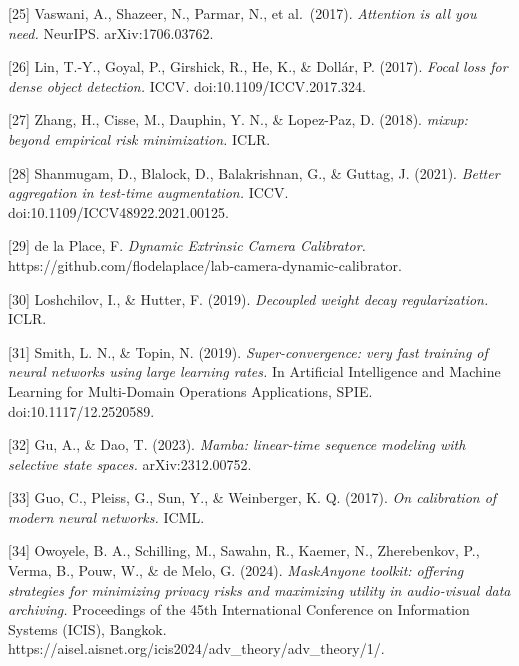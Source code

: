 \documentclass[
  11pt,
]{article}
\begin{document}
{[}25{]} Vaswani, A., Shazeer, N., Parmar, N., et al.~(2017).
\emph{Attention is all you need.} NeurIPS. arXiv:1706.03762.

{[}26{]} Lin, T.-Y., Goyal, P., Girshick, R., He, K., \& Dollár, P.
(2017). \emph{Focal loss for dense object detection.} ICCV.
doi:10.1109/ICCV.2017.324.

{[}27{]} Zhang, H., Cisse, M., Dauphin, Y. N., \& Lopez-Paz, D. (2018).
\emph{mixup: beyond empirical risk minimization.} ICLR.

{[}28{]} Shanmugam, D., Blalock, D., Balakrishnan, G., \& Guttag, J.
(2021). \emph{Better aggregation in test-time augmentation.} ICCV.
doi:10.1109/ICCV48922.2021.00125.

{[}29{]} de la Place, F. \emph{Dynamic Extrinsic Camera Calibrator.}
https://github.com/flodelaplace/lab-camera-dynamic-calibrator.

{[}30{]} Loshchilov, I., \& Hutter, F. (2019). \emph{Decoupled weight
decay regularization.} ICLR.

{[}31{]} Smith, L. N., \& Topin, N. (2019). \emph{Super-convergence:
very fast training of neural networks using large learning rates.} In
Artificial Intelligence and Machine Learning for Multi-Domain Operations
Applications, SPIE. doi:10.1117/12.2520589.

{[}32{]} Gu, A., \& Dao, T. (2023). \emph{Mamba: linear-time sequence
modeling with selective state spaces.} arXiv:2312.00752.

{[}33{]} Guo, C., Pleiss, G., Sun, Y., \& Weinberger, K. Q. (2017).
\emph{On calibration of modern neural networks.} ICML.

{[}34{]} Owoyele, B. A., Schilling, M., Sawahn, R., Kaemer, N.,
Zherebenkov, P., Verma, B., Pouw, W., \& de Melo, G. (2024).
\emph{MaskAnyone toolkit: offering strategies for minimizing privacy
risks and maximizing utility in audio-visual data archiving.}
Proceedings of the 45th International Conference on Information Systems
(ICIS), Bangkok.
https://aisel.aisnet.org/icis2024/adv\_theory/adv\_theory/1/.
\end{document}
